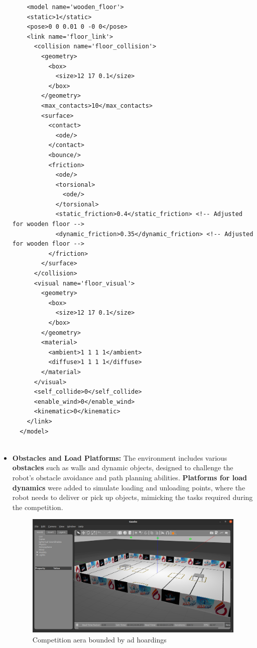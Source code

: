 \documentclass[../../main]{subfiles}
\begin{document}
\begin{itemize}
\begin{verbatim}
    <model name='wooden_floor'>
    <static>1</static>
    <pose>0 0 0.01 0 -0 0</pose>
    <link name='floor_link'>
      <collision name='floor_collision'>
        <geometry>
          <box>
            <size>12 17 0.1</size>
          </box>
        </geometry>
        <max_contacts>10</max_contacts>
        <surface>
          <contact>
            <ode/>
          </contact>
          <bounce/>
          <friction>
            <ode/>
            <torsional>
              <ode/>
            </torsional>
            <static_friction>0.4</static_friction> <!-- Adjusted for wooden floor -->
            <dynamic_friction>0.35</dynamic_friction> <!-- Adjusted for wooden floor -->
          </friction>
        </surface>
      </collision>
      <visual name='floor_visual'>
        <geometry>
          <box>
            <size>12 17 0.1</size>
          </box>
        </geometry>
        <material>
          <ambient>1 1 1 1</ambient>
          <diffuse>1 1 1 1</diffuse>
        </material>
      </visual>
      <self_collide>0</self_collide>
      <enable_wind>0</enable_wind>
      <kinematic>0</kinematic>
    </link>
  </model>
  
\end{verbatim}

    \item \textbf{Obstacles and Load Platforms:} The environment includes various \textbf{obstacles} such as walls and 
    dynamic objects, designed to challenge the robot's obstacle avoidance and path planning abilities. 
    \textbf{Platforms for load dynamics} were added to simulate loading and unloading points, where the robot needs to 
    deliver or pick up objects, mimicking the tasks required during the competition.
    
    \begin{figure}[H]
        \centering
    \includegraphics[width=\textwidth]{fig/walls.png}
    \caption{Competition aera bounded by ad hoardings}
    \label{Walls model} %
    \end{figure}


\end{itemize}
\end{document}
